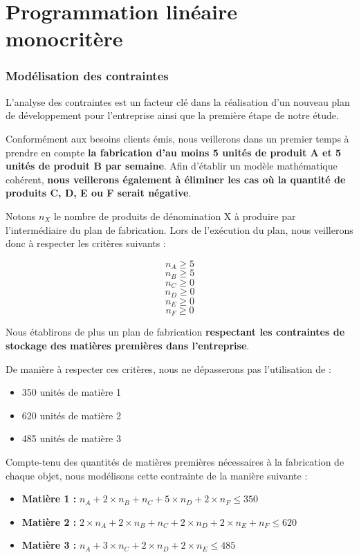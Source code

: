 \documentclass[a4paper,10pt]{article}
\begin{document}
\part{Programmation linéaire monocritère}


\section{Modélisation des contraintes}
L'analyse des contraintes est un facteur clé dans la réalisation d'un nouveau plan de développement pour l'entreprise ainsi que la première étape de notre étude.
\vspace{\baselineskip}

Conformément aux besoins clients émis, nous veillerons dans un premier temps à prendre en compte \textbf{la fabrication d'au moins 5 unités de produit A et 5 unités de produit B par semaine}. Afin d'établir un modèle mathématique cohérent, \textbf{nous veillerons également à éliminer les cas où la quantité de produits C, D, E ou F serait négative}.\newline

Notons $n_X$ le nombre de produits de dénomination X à produire par l'intermédiaire du plan de fabrication. Lors de l'exécution du plan, nous veillerons donc à respecter les critères suivants :

$$n_A \geq 5$$
$$n_B \geq 5$$
$$n_C \geq 0$$
$$n_D \geq 0$$
$$n_E \geq 0$$
$$n_F \geq 0$$

Nous établirons de plus un plan de fabrication \textbf{respectant les contraintes de stockage des matières premières dans l'entreprise}.

De manière à respecter ces critères, nous ne dépasserons pas l'utilisation de :
\newline
\begin{itemize}
\item 350 unités de matière 1
\item 620 unités de matière 2
\item 485 unités de matière 3\newline
\end{itemize}

Compte-tenu des quantités de matières premières nécessaires à la fabrication de chaque objet, nous modélisons cette contrainte de la manière suivante :
\newline
\begin{itemize}
\item[\textbullet]  \textbf{Matière 1 :} $n_A + 2 \times n_B + n_C + 5 \times n_D + 2 \times n_F \leq 350$
\item[\textbullet]  \textbf{Matière 2 :} $2 \times n_A + 2 \times n_B + n_C + 2 \times n_D + 2 \times n_E + n_F \leq 620$
\item[\textbullet]  \textbf{Matière 3 :} $n_A + 3 \times n_C + 2 \times n_D + 2 \times n_E \leq 485$\newline
\end{itemize}
\end{document}
